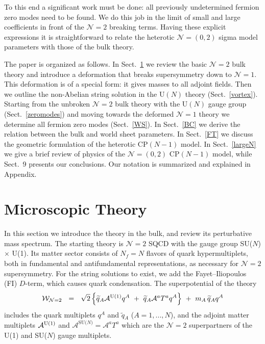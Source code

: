 \documentclass[12pt]{article}
\def\beq{\begin{equation}}
\def\eeq{\end{equation}}
\newcommand{\ntwo}{${\mathcal N}=2$ }
\newcommand{\ntwoo}{${\mathcal N}= \left(0,2\right) $ }
\newcommand{\none}{${\mathcal N}=1$ }
\newcommand{\nonen}{${\mathcal N}=1$}
\newcommand{\wt}{\widetilde}
\newcommand{\mc}[1]{\mathcal{#1}}
\newcommand{\sunun}{{\rm SU($N$) $\times$ U(1)}}
\newcommand{\AU}{\mc{A}^{\rm U(1)}}
\newcommand{\AN}{\mc{A}^\text{SU($N$)}}
\begin{document}
To this end a significant work must be done: all previously undetermined fermion zero modes  
need to be found. We do this job in the limit of small and large coefficients in front of the
\ntwo breaking terms. Having these explicit expressions it is straightforward
to relate the  heterotic \ntwoo 
sigma model parameters with those of the bulk theory.

The paper is organized as follows. In Sect.~\ref{MT} we review the
basic \ntwo bulk theory and introduce a deformation that breaks supersymmetry down to \nonen. This deformation is of a special form: it gives masses to all adjoint
fields.
Then we outline the non-Abelian string solution
in the U$(N)$ theory (Sect.~\ref{vortex}). Starting from the unbroken \ntwo bulk theory
with the U$(N)$ gauge group (Sect.~\ref{zeromodes}) and moving towards
the deformed \none theory we determine all fermion zero modes (Sect.~\ref{WS}).
In Sect.~\ref{BC} we derive the relation between the bulk and world sheet parameters.
In Sect.~\ref{FT} we discuss the geometric formulation of the heterotic CP$(N-1)$ model.
 In Sect.~\ref{largeN} we give  a brief review
of  physics of the \ntwoo CP$(N-1)$ model, while Sect.~9 presents our conclusions. 
Our notation is summarized and explained in Appendix.





\section{Microscopic Theory}
\label{MT}
\setcounter{equation}{0}

In this section we introduce the theory in the bulk, and review its perturbative mass spectrum.
The starting theory is $\mc{N}=2$ SQCD with the gauge group \sunun. 
Its matter sector consists of $ N_f = N $ flavors of quark hypermultiplets,
both in fundamental and antifundamental representations, as necessary for $ \mc{N}=2 $ supersymmetry.
For the string solutions to exist, we add  the Fayet--Iliopoulos (FI) $D$-term, which causes quark
condensation.
The superpotential of the theory 
\beq
\label{ntwo}
	\mc{W}_{\mc{N}=2} ~~=~~  \sqrt{2}\, \Bigl\{ 
					\wt{q}{}_A \AU q^A ~+~
					\wt{q}{}_A \mc{A}^a T^a q^A \Bigr\}  ~+~
				m_A\, \wt{q}{}_A q^A
\eeq
includes the quark multiplets $ q^A $ and $ \wt{q}{}_A $ ($A = 1, ..., N$), and the adjoint matter multiplets
$ \AU $ and $ \AN = \mc{A}^a T^a $ which are the $ \mc{N}=2 $ superpartners of the U(1) and SU($N$) 
gauge multiplets.
\end{document}
